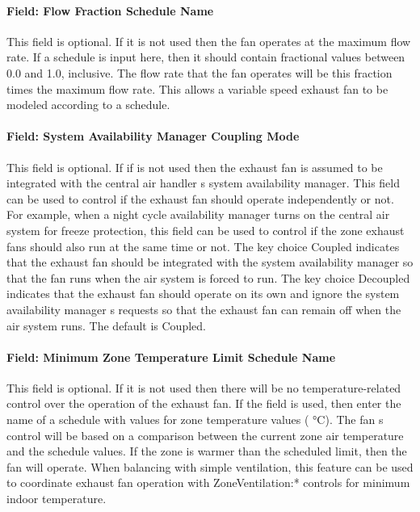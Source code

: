 \paragraph{Field: Flow Fraction Schedule Name}\label{field-flow-fraction-schedule-name}

This field is optional. If it is not used then the fan operates at the maximum flow rate. If a schedule is input here, then it should contain fractional values between 0.0 and 1.0, inclusive. The flow rate that the fan operates will be this fraction times the maximum flow rate. This allows a variable speed exhaust fan to be modeled according to a schedule.

\paragraph{Field: System Availability Manager Coupling Mode}\label{field-system-availability-manager-coupling-mode}

This field is optional. If if is not used then the exhaust fan is assumed to be integrated with the central air handler s system availability manager. This field can be used to control if the exhaust fan should operate independently or not. For example, when a night cycle availability manager turns on the central air system for freeze protection, this field can be used to control if the zone exhaust fans should also run at the same time or not. The key choice Coupled indicates that the exhaust fan should be integrated with the system availability manager so that the fan runs when the air system is forced to run. The key choice Decoupled indicates that the exhaust fan should operate on its own and ignore the system availability manager s requests so that the exhaust fan can remain off when the air system runs. The default is Coupled.

\paragraph{Field: Minimum Zone Temperature Limit Schedule Name}\label{field-minimum-zone-temperature-limit-schedule-name}

This field is optional. If it is not used then there will be no temperature-related control over the operation of the exhaust fan. If the field is used, then enter the name of a schedule with values for zone temperature values ( °C). The fan s control will be based on a comparison between the current zone air temperature and the schedule values. If the zone is warmer than the scheduled limit, then the fan will operate. When balancing with simple ventilation, this feature can be used to coordinate exhaust fan operation with ZoneVentilation:* controls for minimum indoor temperature.

